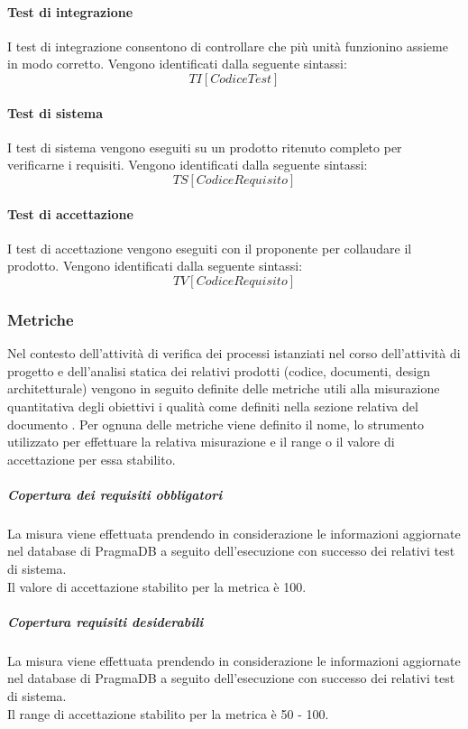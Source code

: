 	\paragraph{Test di integrazione}
		I test di integrazione consentono di controllare che più unità funzionino assieme in modo corretto. Vengono identificati dalla seguente sintassi:
			\[TI[Codice Test]\]
	\paragraph{Test di sistema}
		I test di sistema vengono eseguiti su un prodotto ritenuto completo per verificarne i requisiti. Vengono identificati dalla seguente sintassi:
			\[TS[Codice Requisito]\]
	\paragraph{Test di accettazione}
		I test di accettazione vengono eseguiti con il proponente per collaudare il prodotto. Vengono identificati dalla seguente sintassi:
			\[TV[Codice Requisito]\]

\subsubsection{Metriche}
	Nel contesto dell'attività di verifica dei processi istanziati nel corso dell'attività di progetto e dell'analisi statica dei relativi prodotti (codice, documenti, design architetturale) vengono in seguito definite delle metriche utili alla misurazione quantitativa degli obiettivi i qualità come definiti nella sezione relativa del documento \PdQ .
	Per ognuna delle metriche viene definito il nome, lo strumento utilizzato per effettuare la relativa misurazione e il range o il valore di accettazione per essa stabilito.
	
			
			\subparagraph{Copertura dei requisiti obbligatori}
			La misura viene effettuata prendendo in considerazione le informazioni aggiornate nel database di PragmaDB a seguito dell'esecuzione con successo dei relativi test di sistema.
			\\Il valore di accettazione stabilito per la metrica è 100.
			
			\subparagraph{Copertura requisiti desiderabili}
			La misura viene effettuata prendendo in considerazione le informazioni aggiornate nel database di PragmaDB a seguito dell'esecuzione con successo dei relativi test di sistema.
			\\Il range di accettazione stabilito per la metrica è 50 - 100.
		
